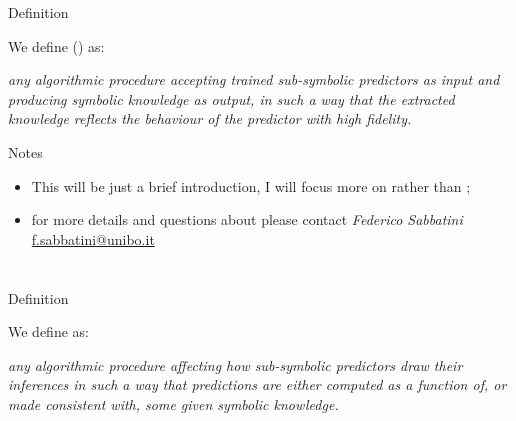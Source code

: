 \documentclass[presentation]{beamer}\mode<presentation>{\usetheme{AMSBolognaFC}}
\begin{document}
\begin{frame}[c]{Definition}
    \begin{block}{We define \longske{} (\ske) as:}
        \begin{displayquote}\itshape
            any \emph{algorithmic} procedure accepting \emph{trained} \alert{sub-symbolic predictors} as input and producing \alert{symbolic knowledge} as output, in such a way that the extracted knowledge \emph{reflects} the behaviour of the predictor with high fidelity.
        \end{displayquote}
    \end{block}
    \begin{block}{Notes}
        \begin{itemize}
            \item This will be just a brief introduction, I will focus more on \longski{} rather than \longske;
            \item for more details and questions about \ske{} please contact \emph{Federico Sabbatini} \href{mailto:f.sabbatini@unibo.it}{f.sabbatini@unibo.it}
        \end{itemize}
    \end{block}
    
\end{frame}







\section{\longski}
    
\begin{frame}[c]{Definition}
    \begin{block}{We define \longski{} as: }
        \begin{displayquote}\itshape
            any \emph{algorithmic} procedure affecting how \alert{sub-symbolic predictors} draw their inferences in such a way that predictions are either \emph{computed} as a function of, or made \emph{consistent} with, some \emph{given} \alert{symbolic knowledge}.
        \end{displayquote}
    \end{block}
    
\end{frame}
\end{document}
